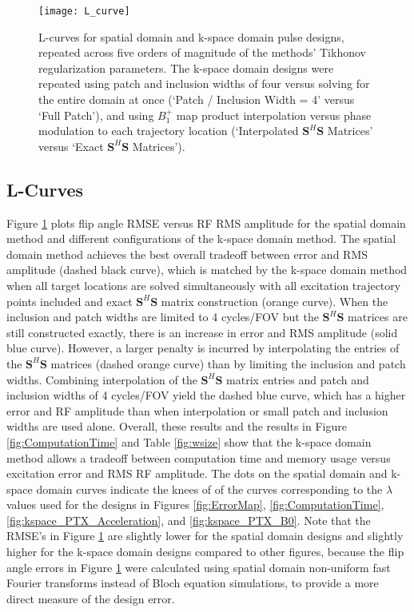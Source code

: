 \begin{figure}
	\centering
	\texttt{[image: L\_curve]}
	\caption{L-curves for spatial domain and k-space domain pulse designs, 
	repeated across five orders of magnitude of the methods' Tikhonov regularization parameters.
	The k-space domain designs were repeated using patch and inclusion widths of four versus solving for the entire domain at once (`Patch / Inclusion Width = 4' versus `Full Patch'),
	and using $B_1^+$ map product interpolation versus phase modulation to each trajectory location (`Interpolated $\bm{S}^H\bm{S}$ Matrices' versus
	`Exact $\bm{S}^H\bm{S}$ Matrices').}
	\label{fig:LCurves}
\end{figure}

\subsection*{L-Curves}
Figure \ref{fig:LCurves} plots flip angle RMSE versus RF RMS amplitude for the spatial domain method
and different configurations of the k-space domain method.
The spatial domain method achieves the best overall tradeoff between error and RMS amplitude (dashed black curve),
which is matched by the k-space domain method when all target locations are solved simultaneously with
all excitation trajectory points included and exact $\bm{S}^H\bm{S}$ matrix construction (orange curve). 
When the inclusion and patch widths are limited to 4 cycles/FOV but the $\bm{S}^H\bm{S}$ 
matrices are still constructed exactly, there is an increase in error and RMS amplitude (solid blue curve). 
However, a larger penalty is incurred by interpolating the entries of the $\bm{S}^H\bm{S}$ matrices (dashed orange curve)
than by limiting the inclusion and patch widths.
Combining interpolation of the $\bm{S}^H\bm{S}$ matrix entries and patch and inclusion widths of 4 cycles/FOV yield 
the dashed blue curve, which has a higher error and RF amplitude than when interpolation or small patch and inclusion widths are
used alone.
Overall, these results and the results in Figure \ref{fig:ComputationTime} and Table \ref{fig:wsize}
show that the k-space domain method allows a tradeoff between computation time and memory usage versus
excitation error and RMS RF amplitude.
The dots on the spatial domain and k-space domain curves indicate the knees of of the curves corresponding to
the $\lambda$ values used for the designs in Figures \ref{fig:ErrorMap}, \ref{fig:ComputationTime}, \ref{fig:kspace_PTX_Acceleration}, and \ref{fig:kspace_PTX_B0}.
Note that the RMSE's in Figure \ref{fig:LCurves} are slightly lower for the spatial domain designs
and slightly higher for the k-space domain designs compared to other figures,
because the flip angle errors in Figure \ref{fig:LCurves} were calculated using 
spatial domain non-uniform fast Fourier transforms instead of Bloch equation simulations, 
to provide a more direct measure of the design error. 

